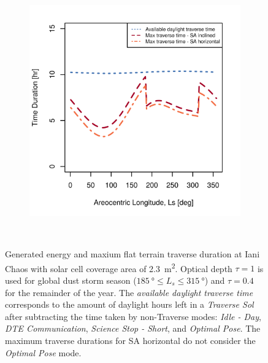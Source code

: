 \begin{figure}[h]
\begin{subfigure}[t]{\subfigureWidth}
        \includegraphics[height=\graphicsHeight]{sections/power-system-design/solar-array/plots/ianichaos-75w-max-traverse-durations-for-solar-cell-coverage-area-23m2.png}
		\label{fig:plot:sub:iani-chaos-max-traverse-durations}
	\end{subfigure}\\[0.8ex]
    \caption[Generated energy and maxium flat terrain traverse durations at Iani Chaos]
            {Generated energy and maxium flat terrain traverse duration at Iani Chaos with solar cell coverage area of \SI{2.3}{m^{2}}. Optical depth  $\tau = 1$ is used for global dust storm season ($\SI{185}{\degree} \leq L_{s} \leq \SI{315}{\degree}$) and $\tau = 0.4$ for the remainder of the year. The \textit{available daylight traverse time} corresponds to the amount of daylight hours left in a \textit{Traverse Sol} after subtracting the time taken by non-Traverse modes: \textit{Idle - Day}, \textit{\ac{DTE} Communication}, \textit{Science Stop - Short}, and \textit{Optimal Pose}. The maximum traverse durations for \ac{SA} horizontal do not consider the \textit{Optimal Pose} mode.}
    \label{fig:plot:iani-chaos-generated-energy-and-max-traverse-durations}
\vspace{-2ex}
\end{figure}

